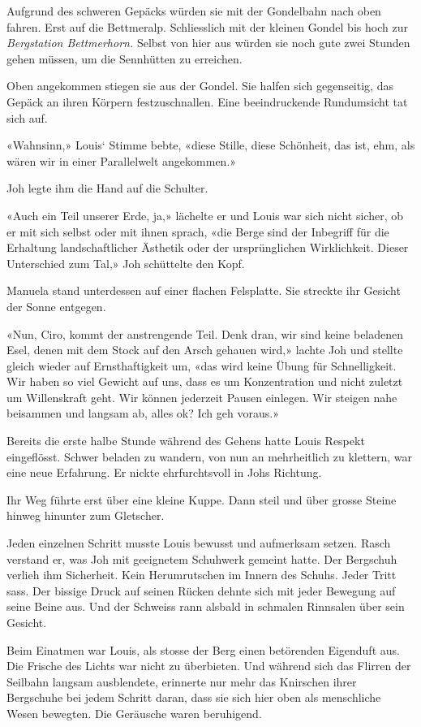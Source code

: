 Aufgrund des schweren Gepäcks würden sie mit der Gondelbahn nach oben
fahren. Erst auf die Bettmeralp. Schliesslich mit der kleinen Gondel bis
hoch zur \emph{Bergstation Bettmerhorn.} Selbst von hier aus würden sie
noch gute zwei Stunden gehen müssen, um die Sennhütten zu erreichen.

Oben angekommen stiegen sie aus der Gondel. Sie halfen sich gegenseitig,
das Gepäck an ihren Körpern festzuschnallen. Eine beeindruckende
Rundumsicht tat sich auf.

«Wahnsinn,» Louis` Stimme bebte, «diese Stille, diese Schönheit, das
ist, ehm, als wären wir in einer Parallelwelt angekommen.»

Joh legte ihm die Hand auf die Schulter.

«Auch ein Teil unserer Erde, ja,» lächelte er und Louis war sich nicht
sicher, ob er mit sich selbst oder mit ihnen sprach, «die Berge sind der
Inbegriff für die Erhaltung landschaftlicher Ästhetik oder der
ursprünglichen Wirklichkeit. Dieser Unterschied zum Tal,» Joh schüttelte
den Kopf.

Manuela stand unterdessen auf einer flachen Felsplatte. Sie streckte ihr
Gesicht der Sonne entgegen.

«Nun, Ciro, kommt der anstrengende Teil. Denk dran, wir sind keine
beladenen Esel, denen mit dem Stock auf den Arsch gehauen wird,» lachte
Joh und stellte gleich wieder auf Ernsthaftigkeit um, «das wird keine
Übung für Schnelligkeit. Wir haben so viel Gewicht auf uns, dass es um
Konzentration und nicht zuletzt um Willenskraft geht. Wir können
jederzeit Pausen einlegen. Wir steigen nahe beisammen und langsam ab,
alles ok? Ich geh voraus.»

Bereits die erste halbe Stunde während des Gehens hatte Louis Respekt
eingeflösst. Schwer beladen zu wandern, von nun an mehrheitlich zu
klettern, war eine neue Erfahrung. Er nickte ehrfurchtsvoll in Johs
Richtung.

Ihr Weg führte erst über eine kleine Kuppe. Dann steil und über grosse
Steine hinweg hinunter zum Gletscher.

Jeden einzelnen Schritt musste Louis bewusst und aufmerksam setzen.
Rasch verstand er, was Joh mit geeignetem Schuhwerk gemeint hatte. Der
Bergschuh verlieh ihm Sicherheit. Kein Herumrutschen im Innern des
Schuhs. Jeder Tritt sass. Der bissige Druck auf seinen Rücken dehnte
sich mit jeder Bewegung auf seine Beine aus. Und der Schweiss rann
alsbald in schmalen Rinnsalen über sein Gesicht.

Beim Einatmen war Louis, als stosse der Berg einen betörenden Eigenduft
aus. Die Frische des Lichts war nicht zu überbieten. Und während sich
das Flirren der Seilbahn langsam ausblendete, erinnerte nur mehr das
Knirschen ihrer Bergschuhe bei jedem Schritt daran, dass sie sich hier
oben als menschliche Wesen bewegten. Die Geräusche waren beruhigend.

